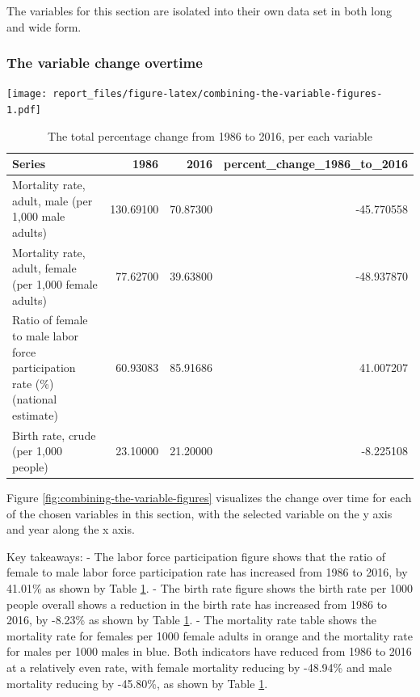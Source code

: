 \documentclass[11pt,a4paper,]{article}
\let\origfigure\figure
\let\endorigfigure\endfigure
\renewenvironment{figure}[1][2] {
    \expandafter\origfigure\expandafter[H]
} {
    \endorigfigure
}%
\begin{document}
The variables for this section are isolated into their own data set in
both long and wide form.

\subsubsection{The variable change
overtime}\label{the-variable-change-overtime}

\begin{figure}
\centering
\texttt{[image: report\_files/figure-latex/combining-the-variable-figures-1.pdf]}
\caption{\label{fig:combining-the-variable-figures}Each figure visualises
the chosen variables}
\end{figure}

\begin{table}[!h]

\caption{\label{tab:percent-change-over-the-observed-time-period}The total percentage change from 1986 to 2016, per each variable}
\centering
\fontsize{7}{9}\selectfont
\begin{tabular}[t]{l|r|r|r}
\hline
Series & 1986 & 2016 & percent\_change\_1986\_to\_2016\\
\hline
Mortality rate, adult, male (per 1,000 male adults) & 130.69100 & 70.87300 & -45.770558\\
\hline
Mortality rate, adult, female (per 1,000 female adults) & 77.62700 & 39.63800 & -48.937870\\
\hline
Ratio of female to male labor force participation rate (\%) (national estimate) & 60.93083 & 85.91686 & 41.007207\\
\hline
Birth rate, crude (per 1,000 people) & 23.10000 & 21.20000 & -8.225108\\
\hline
\end{tabular}
\end{table}

Figure \ref{fig:combining-the-variable-figures} visualizes the change
over time for each of the chosen variables in this section, with the
selected variable on the y axis and year along the x axis.

Key takeaways: - The labor force participation figure shows that the
ratio of female to male labor force participation rate has increased
from 1986 to 2016, by 41.01\% as shown by Table
\ref{tab:percent-change-over-the-observed-time-period}. - The birth rate
figure shows the birth rate per 1000 people overall shows a reduction in
the birth rate has increased from 1986 to 2016, by -8.23\% as shown by
Table \ref{tab:percent-change-over-the-observed-time-period}. - The
mortality rate table shows the mortality rate for females per 1000
female adults in orange and the mortality rate for males per 1000 males
in blue. Both indicators have reduced from 1986 to 2016 at a relatively
even rate, with female mortality reducing by -48.94\% and male mortality
reducing by -45.80\%, as shown by Table
\ref{tab:percent-change-over-the-observed-time-period}.
\end{document}

